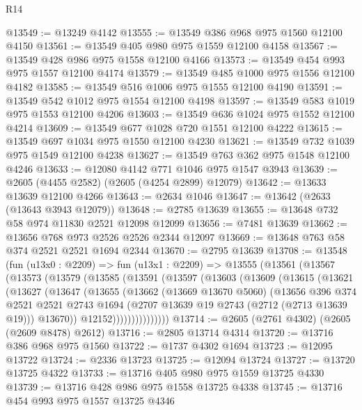 \begin{lexlean}{R14}
\begin{coremodule}
@13549 := @13249 @4142
@13555 := @13549 @386 @968 @975 @1560 @12100 @4150
@13561 := @13549 @405 @980 @975 @1559 @12100 @4158
@13567 := @13549 @428 @986 @975 @1558 @12100 @4166
@13573 := @13549 @454 @993 @975 @1557 @12100 @4174
@13579 := @13549 @485 @1000 @975 @1556 @12100 @4182
@13585 := @13549 @516 @1006 @975 @1555 @12100 @4190
@13591 := @13549 @542 @1012 @975 @1554 @12100 @4198
@13597 := @13549 @583 @1019 @975 @1553 @12100 @4206
@13603 := @13549 @636 @1024 @975 @1552 @12100 @4214
@13609 := @13549 @677 @1028 @720 @1551 @12100 @4222
@13615 := @13549 @697 @1034 @975 @1550 @12100 @4230
@13621 := @13549 @732 @1039 @975 @1549 @12100 @4238
@13627 := @13549 @763 @362 @975 @1548 @12100 @4246
@13633 := @12080 @4142 @771 @1046 @975 @1547 @3943
@13639 := @2605 (@4455 @2582) (@2605 (@4254 @2899) @12079)
@13642 := @13633 @13639 @12100 @4266
@13643 := @2634 @1046
@13647 := @13642 (@2633 (@13643 @3943 @12079))
@13648 := @2785 @13639
@13655 := @13648 @732 @58 @974 @11830 @2521 @12098 @12099
@13656 := @7481 @13639
@13662 := @13656 @768 @973 @2526 @2526 @2344 @12097
@13669 := @13648 @763 @58 @374 @2521 @2521 @1694 @2344
@13670 := @2795 @13639
@13708 := @13548
    (fun (u13x0 : @2209) =>
    fun (u13x1 : @2209) =>
    @13555
      (@13561
        (@13567
          (@13573
            (@13579
              (@13585
                (@13591
                  (@13597
                    (@13603
                      (@13609
                        (@13615
                          (@13621
                            (@13627
                              (@13647
                                (@13655
                                  (@13662
                                    (@13669 @13670 @5060)
                                    (@13656
                                      @396
                                      @374
                                      @2521
                                      @2521
                                      @2743
                                      @1694
                                      (@2707 @13639 @19 @2743 (@2712 (@2713 @13639 @19)))
                                      @13670))
                                  @12152)))))))))))))))
@13714 := @2605 (@2761 @4302) (@2605 (@2609 @8478) @2612)
@13716 := @2805 @13714 @4314
@13720 := @13716 @386 @968 @975 @1560
@13722 := @1737 @4302 @1694
@13723 := @12095 @13722
@13724 := @2336 @13723
@13725 := @12094 @13724
@13727 := @13720 @13725 @4322
@13733 := @13716 @405 @980 @975 @1559 @13725 @4330
@13739 := @13716 @428 @986 @975 @1558 @13725 @4338
@13745 := @13716 @454 @993 @975 @1557 @13725 @4346

\end{coremodule}
\end{lexlean}
